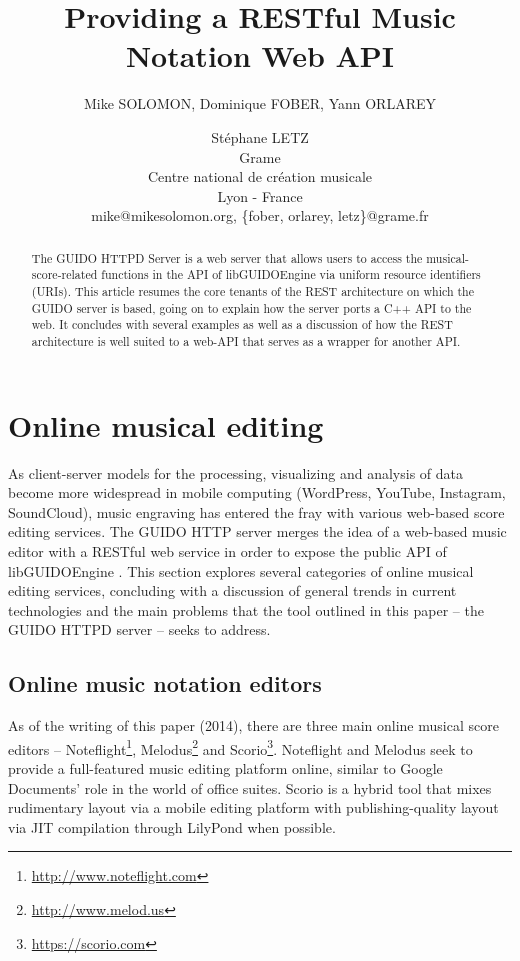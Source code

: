 \documentclass[11pt,a4paper]{article}
\title{Providing a RESTful Music Notation Web API}
\author
{Mike SOLOMON, Dominique FOBER, Yann ORLAREY \and Stéphane LETZ
\\ Grame
\\ Centre national de création musicale
\\ Lyon - France 
\\ mike@mikesolomon.org, \{fober, orlarey, letz\}@grame.fr 
}
\date{}
\begin{document}
\maketitle

\begin{abstract}

The GUIDO HTTPD Server is a web server that allows users to access the musical-score-related functions in the API of libGUIDOEngine via uniform resource identifiers (URIs).  This article resumes the core tenants of the REST architecture on which the GUIDO server is based, going on to explain how the server ports a C++ API to the web.  It concludes with several examples as well as a discussion of how the REST architecture is well suited to a web-API that serves as a wrapper for another API.
\end{abstract}


\section{Online musical editing}\label{section:online-musical-editing}
As client-server models for the processing, visualizing and analysis of data become more widespread in mobile computing (WordPress, YouTube, Instagram, SoundCloud), music engraving has entered the fray with various web-based score editing services.  The GUIDO HTTP server merges the idea of a web-based music editor with a RESTful web service in order to expose the public API of libGUIDOEngine \cite{guido}. This section explores several categories of online musical editing services, concluding with a discussion of general trends in current technologies and the main problems that the tool outlined in this paper -- the GUIDO HTTPD server -- seeks to address.
\subsection{Online music notation editors}\label{subsection:editor}
As of the writing of this paper (2014), there are three main online musical score editors -- Noteflight\footnote{\url{http://www.noteflight.com}}, Melodus\footnote{\url{http://www.melod.us}} and Scorio\footnote{\url{https://scorio.com}}.  Noteflight and Melodus seek to provide a full-featured music editing platform online, similar to Google Documents' role in the world of office suites.  Scorio is a hybrid tool that mixes rudimentary layout via a mobile editing platform with publishing-quality layout via JIT compilation through LilyPond when possible.
\end{document}
